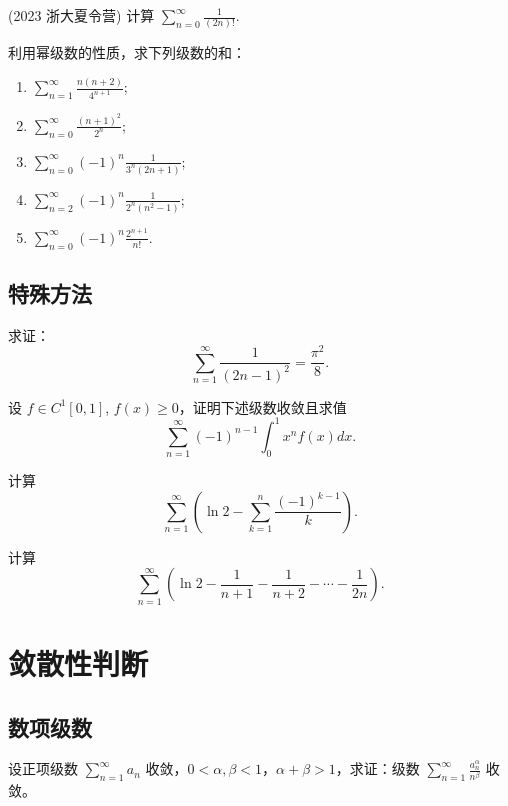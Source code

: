 \documentclass[lang=cn,10pt,thmcnt=section]{elegantbook}
\begin{document}
	\begin{example}
	(2023 浙大夏令营) 计算 $\sum_{n=0}^{\infty} \frac{1}{(2n)!}$.
	\end{example}

	\begin{example}
		利用幂级数的性质，求下列级数的和：
		\begin{enumerate}
			\item $\sum_{n=1}^{\infty} \frac{n(n+2)}{4^{n+1}}$;
			\item $\sum_{n=0}^{\infty} \frac{(n+1)^2}{2^n}$;
			\item $\sum_{n=0}^{\infty} (-1)^n \frac{1}{3^n (2n+1)}$;
			\item $\sum_{n=2}^{\infty} (-1)^n \frac{1}{2^n (n^2 - 1)}$;
			\item $\sum_{n=0}^{\infty} (-1)^n \frac{2^{n+1}}{n!}$.
		\end{enumerate}
	\end{example}
\subsection{特殊方法}
\begin{example}
	求证：
\[
\sum_{n=1}^{\infty} \frac{1}{(2n-1)^2} = \frac{\pi^2}{8}.
\]
\end{example}
\begin{example}
	设 $f \in C^1[0,1]$, $f(x) \geq 0$，证明下述级数收敛且求值
\[
\sum_{n=1}^{\infty} (-1)^{n-1} \int_0^1 x^n f(x) dx.
\]
\end{example}
\begin{example}
	计算
\[
\sum_{n=1}^{\infty} \left( \ln 2 - \sum_{k=1}^n \frac{(-1)^{k-1}}{k} \right).
\]
\end{example}
\begin{example}
	计算
\[
\sum_{n=1}^{\infty} \left( \ln 2 - \frac{1}{n+1} - \frac{1}{n+2} - \cdots - \frac{1}{2n} \right).
\]          
\end{example}
\section{敛散性判断}
\subsection{数项级数}
\begin{example}
	设正项级数 $\sum_{n=1}^{\infty} a_n$ 收敛，$0 < \alpha, \beta < 1$，$\alpha + \beta > 1$，求证：级数 $\sum_{n=1}^{\infty} \frac{a_n^{\alpha}}{n^{\beta}}$ 收敛。
	\end{example}
	
\end{document}
